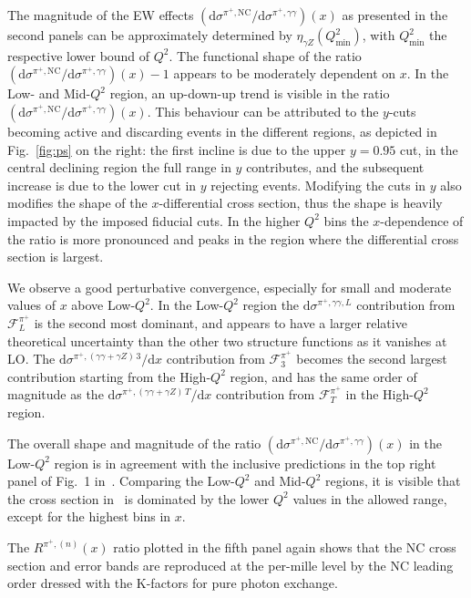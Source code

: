 \documentclass[11pt,a4paper]{article}
\newcommand{\Fcal}{\mathcal{F}}
\newcommand{\dd}{\mathrm{d}}
\begin{document}
The magnitude of the EW effects $(\dd\sigma^{\pi^+,\mathrm{NC}}/\dd\sigma^{\pi^+,\gamma\gamma})(x)$ as presented in the second panels can be approximately determined by $\eta_{\gamma Z}(Q^2_\mathrm{min})$, with $Q^2_\mathrm{min}$ the respective lower bound of $Q^2$.
The functional shape of the ratio $(\dd\sigma^{\pi^+,\mathrm{NC}}/\dd\sigma^{\pi^+,\gamma\gamma})(x)-1$ appears to be moderately dependent on $x$.
In the Low- and Mid-$Q^2$ region, an up-down-up trend is visible in the ratio $(\dd\sigma^{\pi^+,\mathrm{NC}}/\dd\sigma^{\pi^+,\gamma\gamma})(x)$.
This behaviour can be attributed to the $y$-cuts becoming active and discarding events in the different regions, as depicted in Fig.~\ref{fig:ps} on the right: the first incline is due to the upper $y=0.95$ cut, in the central declining region the full range in $y$ contributes, and the subsequent increase is due to the lower cut in $y$ rejecting events.
%
Modifying the cuts in $y$ also modifies the shape of the $x$-differential cross section, thus the shape is heavily impacted by the imposed fiducial cuts.
%
In the higher $Q^2$ bins the $x$-dependence of the ratio is more pronounced and peaks in the region where the differential cross section is largest.

We observe a good perturbative convergence, especially for small and moderate values of $x$ above Low-$Q^2$.
In the Low-$Q^2$ region the $\dd\sigma^{\pi^+,\gamma\gamma,L}$ contribution from $\Fcal^{\pi^+}_L$ is the second most dominant, and appears to have a larger relative theoretical uncertainty than the other two structure functions as it vanishes at LO.
The $\dd\sigma^{\pi^+,(\gamma\gamma+\gamma Z)\,3}/\dd x$ contribution from $\Fcal^{\pi^+}_3$ becomes the second largest contribution starting from the High-$Q^2$ region, and has the same order of magnitude as the $\dd\sigma^{\pi^+,(\gamma\gamma+\gamma Z)\,T}/\dd x$ contribution from $\Fcal^{\pi^+}_T$ in the High-$Q^2$ region.

The overall shape and magnitude of the ratio $(\dd\sigma^{\pi^+,\mathrm{NC}}/\dd\sigma^{\pi^+,\gamma\gamma})(x)$ in the Low-$Q^2$ region is in agreement with the inclusive predictions in the top right panel of Fig.~1 in~\cite{Borsa:2022cap}.
Comparing the Low-$Q^2$ and Mid-$Q^2$ regions, it is visible that the cross section in~\cite{Borsa:2022cap} is dominated by the lower $Q^2$ values in the allowed range, except for the highest bins in $x$.

The $R^{\pi^+,(n)}(x)$ ratio plotted in the fifth panel again shows that the NC cross section and error bands are reproduced at the per-mille level by the NC leading order dressed with the K-factors for pure photon exchange.
\end{document}

